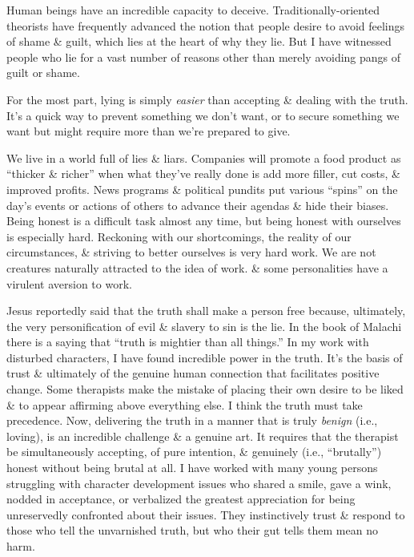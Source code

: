 \documentclass{article}
\numberwithin{equation}{section}
\begin{document}
Human beings have an incredible capacity to deceive. Traditionally-oriented theorists have frequently advanced the notion that people desire to avoid feelings of shame \& guilt, which lies at the heart of why they lie. But I have witnessed people who lie for a vast number of reasons other than merely avoiding pangs of guilt or shame.

For the most part, lying is simply \textit{easier} than accepting \& dealing with the truth. It's a quick way to prevent something we don't want, or to secure something we want but might require more than we're prepared to give.

We live in a world full of lies \& liars. Companies will promote a food product as ``thicker \& richer'' when what they've really done is add more filler, cut costs, \& improved profits. News programs \& political pundits put various ``spins'' on the day's events or actions of others to advance their agendas \& hide their biases. Being honest is a difficult task almost any time, but being honest with ourselves is especially hard. Reckoning with our shortcomings, the reality of our circumstances, \& striving to better ourselves is very hard work. We are not creatures naturally attracted to the idea of work. \& some personalities have a virulent aversion to work.

Jesus reportedly said that the truth shall make a person free because, ultimately, the very personification of evil \& slavery to sin is the lie. In the book of Malachi there is a saying that ``truth is mightier than all things.'' In my work with disturbed characters, I have found incredible power in the truth. It's the basis of trust \& ultimately of the genuine human connection that facilitates positive change. Some therapists make the mistake of placing their own desire to be liked \& to appear affirming above everything else. I think the truth must take precedence. Now, delivering the truth in a manner that is truly \textit{benign} (i.e., loving), is an incredible challenge \& a genuine art. It requires that the therapist be simultaneously accepting, of pure intention, \& genuinely (i.e., ``brutally'') honest without being brutal at all. I have worked with many young persons struggling with character development issues who shared a smile, gave a wink, nodded in acceptance, or verbalized the greatest appreciation for being unreservedly confronted about their issues. They instinctively trust \& respond to those who tell the unvarnished truth, but who their gut tells them mean no harm.
\end{document}
